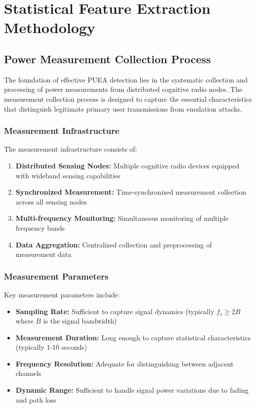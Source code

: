 \chapter{Statistical Feature Extraction Methodology}

\section{Power Measurement Collection Process}
The foundation of effective PUEA detection lies in the systematic collection and processing of power measurements from distributed cognitive radio nodes. The measurement collection process is designed to capture the essential characteristics that distinguish legitimate primary user transmissions from emulation attacks.

\subsection{Measurement Infrastructure}
The measurement infrastructure consists of:

\begin{enumerate}
\item \textbf{Distributed Sensing Nodes:} Multiple cognitive radio devices equipped with wideband sensing capabilities
\item \textbf{Synchronized Measurement:} Time-synchronized measurement collection across all sensing nodes
\item \textbf{Multi-frequency Monitoring:} Simultaneous monitoring of multiple frequency bands
\item \textbf{Data Aggregation:} Centralized collection and preprocessing of measurement data
\end{enumerate}

\subsection{Measurement Parameters}
Key measurement parameters include:
\begin{itemize}
\item \textbf{Sampling Rate:} Sufficient to capture signal dynamics (typically $f_s \geq 2B$ where $B$ is the signal bandwidth)
\item \textbf{Measurement Duration:} Long enough to capture statistical characteristics (typically 1-10 seconds)
\item \textbf{Frequency Resolution:} Adequate for distinguishing between adjacent channels
\item \textbf{Dynamic Range:} Sufficient to handle signal power variations due to fading and path loss
\end{itemize}

